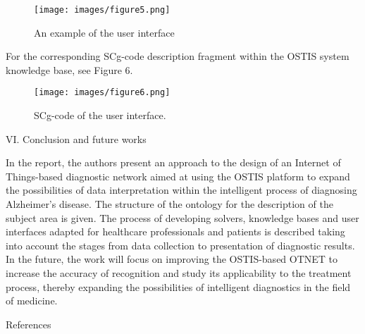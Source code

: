 \documentclass{scndocument}
\begin{document}
\begin{multicols*}{2}
\begin{figure}[H]
    \centering
    \texttt{[image: images/figure5.png]}
    \caption{An example of the user interface}
\end{figure}

For the corresponding SCg-code description fragment within the OSTIS system knowledge base, see Figure 6.

\begin{figure}[H]
    \centering
    \texttt{[image: images/figure6.png]}
    \caption{SCg-code of the user interface.}
\end{figure}

\begingroup
\centering
\normalsize VI. Conclusion and future works

\endgroup

\normalsize In the report, the authors present an approach to the design of an Internet of Things-based diagnostic network aimed at using the OSTIS platform to expand the possibilities of data interpretation within the intelligent process of diagnosing Alzheimer’s disease. The structure of the ontology for the description of the subject area is given. The process of developing solvers, knowledge bases and user interfaces adapted for healthcare professionals and patients is described taking into account the stages from data collection to presentation of diagnostic results. In the future, the work will focus on improving the OSTIS-based OTNET to increase the accuracy of recognition and study its applicability to the treatment process, thereby expanding the possibilities of intelligent diagnostics in the field of medicine.
\vspace{3mm}

\begingroup
\centering
References


\end{multicols*}
\end{document}
